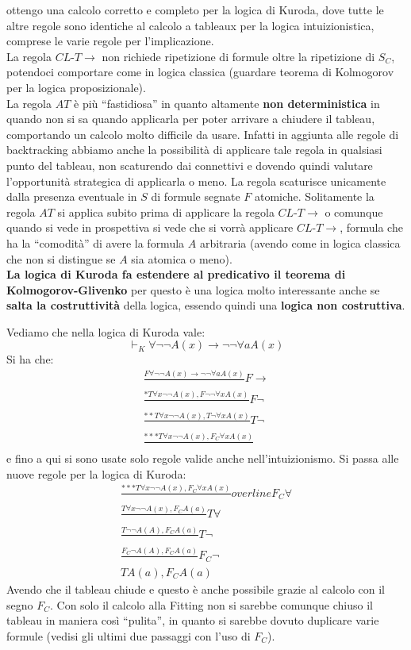 \documentclass[a4paper,12pt, oneside]{book}
\begin{document}
ottengo una calcolo corretto e completo per la logica di Kuroda, dove tutte le
altre regole sono identiche al calcolo a tableaux per la logica
intuizionistica, comprese le varie regole per l'implicazione.\\
La regola $CL\mbox{-}T\to$ non richiede ripetizione di formule oltre la
ripetizione di 
$S_C$, potendoci comportare come in logica classica (guardare teorema di
Kolmogorov per la logica proposizionale). \\
La regola $AT$ è più ``fastidiosa'' in quanto altamente \textbf{non
  deterministica} in quando non si sa quando applicarla per poter arrivare a
chiudere il tableau, comportando un calcolo molto difficile da usare. Infatti
in aggiunta alle regole di backtracking abbiamo anche la possibilità di
applicare tale regola in qualsiasi punto del tableau, non scaturendo dai
connettivi e dovendo quindi valutare l'opportunità strategica di applicarla o
meno. La regola scaturisce unicamente dalla presenza eventuale in $S$ di formule
segnate $F$ atomiche. Solitamente la regola $AT$ si applica subito prima di
applicare la regola $CL\mbox{-}T\to$ o comunque quando si vede in prospettiva si
vede che si vorrà applicare $CL\mbox{-}T\to$, formula che ha la ``comodità'' di
avere la formula $A$ arbitraria (avendo come in logica classica che non si
distingue se $A$ sia atomica o meno). \\
\textbf{La logica di Kuroda fa estendere al predicativo il teorema di\\
  Kolmogorov-Glivenko} per questo è una logica molto interessante anche se
\textbf{salta la costruttività} della logica, essendo quindi una \textbf{logica
  non costruttiva}.
\begin{esempio}
  Vediamo che nella logica di Kuroda vale:
  \[\vdash_K \forall \neg\neg A(x)\to\neg\neg \forall a A(x)\]
  Si ha che:
  \begin{gather*}
    \frac{F\forall \neg\neg A(x)\to\neg\neg \forall a A(x)}{}F\to\\
    \frac{*T\forall x\neg\neg A(x),F\neg\neg \forall xA(x)}{}F\neg\\
    \frac{**T\forall x\neg\neg A(x), T\neg\forall x A(x)}{}T\neg\\
    \frac{***T\forall x\neg\neg A(x), F_C\forall x A(x)}{}
  \end{gather*}
  e fino a qui si sono usate solo regole valide anche nell'intuizionismo. Si
  passa alle nuove regole per la logica di Kuroda:
  \begin{gather*}
    \frac{***T\forall x\neg\neg A(x), F_C\forall x A(x)}{}overline{F_C\forall}\\
    \frac{T\forall x\neg\neg A(x), F_CA(a)}{}T\forall\\
    \frac{T\neg\neg A(A), F_CA(a)}{}T\neg\\
    \frac{F_C\neg A(A), F_CA(a)}{}F_C\neg\\
    TA(a), F_CA(a)
  \end{gather*}
  Avendo che il tableau chiude e questo è anche possibile grazie al calcolo con
  il segno $F_C$. Con solo il calcolo alla Fitting non si sarebbe comunque
  chiuso il tableau in maniera così ``pulita'', in quanto si sarebbe dovuto
  duplicare varie formule (vedisi gli ultimi due passaggi con l'uso di $F_C$).  
\end{esempio}
\end{document}
